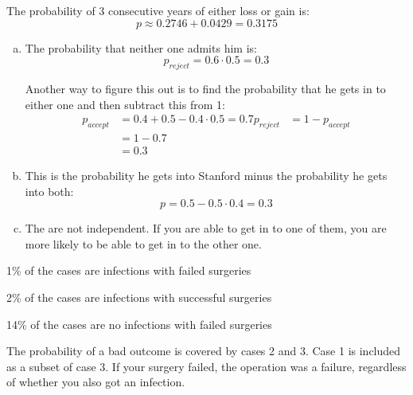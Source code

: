 \documentclass[letterpaper]{exam}
\begin{document}
\begin{description}
\begin{enumerate}[(a)]
            The probability of 3 consecutive years of either loss or gain is:
            \[
              p \approx 0.2746 + 0.0429 = \boxed{ 0.3175 }
            \]

        \end{enumerate}

      \item[31]
        \begin{enumerate}[(a)]
          \item The probability that neither one admits him is:
            \[
              p_{reject} = 0.6 \cdot 0.5 = \boxed{ 0.3 }
            \]

            Another way to figure this out is to find the probability that he
            gets in to either one and then subtract this from 1:
            \begin{align*}
              p_{accept} & = 0.4 + 0.5 - 0.4 \cdot 0.5 = 0.7
              p_{reject} & = 1 - p_{accept} \\
                         & = 1 - 0.7 \\
                         & = 0.3
            \end{align*}

          \item
            This is the probability he gets into Stanford minus the probability
            he gets into both:
            \[
              p = 0.5 - 0.5 \cdot 0.4 = \boxed{ 0.3 }
            \]
            
          \item The are not independent. If you are able to get in to one of
            them, you are more likely to be able to get in to the other one.

        \end{enumerate}

      \item[32]
        \begin{enumerate*}
          \item 1\% of the cases are infections with failed surgeries
          \item 2\% of the cases are infections with successful surgeries
          \item 14\% of the cases are no infections with failed surgeries
        \end{enumerate*}

        The probability of a bad outcome is covered by cases 2 and 3. Case 1 is
        included as a subset of case 3. If your surgery failed, the operation
        was a failure, regardless of whether you also got an infection.


\end{description}
\end{document}

